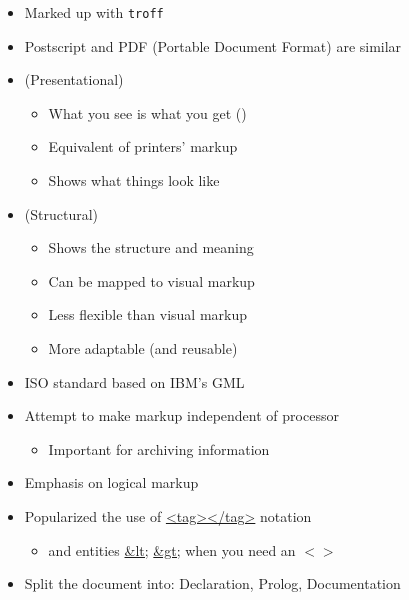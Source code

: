 \documentclass[a4paper,landscape,headrule,footrule,xetex]{foils}
\begin{document}
\begin{itemize}
\item   Marked up with \texttt{troff}
\item  Postscript and PDF (Portable Document Format) are similar
\end{itemize}



\begin{itemize}
\item {} (Presentational)
  \begin{itemize}
  \item What you see is what you get ()
  \item Equivalent of printers' markup
  \item Shows what things look like
  \end{itemize}
\item {} (Structural)
  \begin{itemize}
  \item Shows the structure and meaning
  \item Can be mapped to visual markup
  \item Less flexible than visual markup
  \item More adaptable (and reusable)
  \end{itemize}
\end{itemize}



\begin{itemize}
\item ISO standard based on IBM's GML
\item Attempt to make markup independent of processor
  \begin{itemize}
  \item Important for archiving information
  \end{itemize}
\item Emphasis on logical markup\item Popularized the use of \url{<tag></tag>} notation
  \begin{itemize}
  \item and entities \url{&lt;} \url{&gt;} when you need an $< >$
  \end{itemize}
\item Split the document into: Declaration, Prolog, Documentation
\end{itemize}
\end{document}
